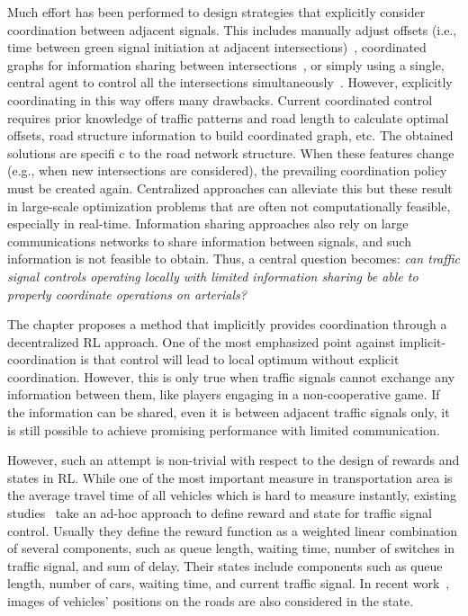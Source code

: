 Much effort has been performed to design strategies that explicitly consider coordination between adjacent signals. This includes manually adjust offsets (i.e., time between green signal initiation at adjacent intersections)~\cite{urbanik2015signal}, coordinated graphs for information sharing between intersections~\cite{KWBV08,VaOl16}, or simply using a single, central agent to control all the intersections simultaneously~\cite{brockfeld2001optimizing}. However, explicitly coordinating in this way offers many drawbacks. Current coordinated control requires prior knowledge of traffic patterns and road length to calculate optimal offsets, road structure information to build coordinated graph, etc. The obtained solutions are specifi c to the road network structure. When these features change (e.g., when new intersections are considered), the prevailing coordination policy must be created again. Centralized approaches can alleviate this but these result in large-scale optimization problems that are often not computationally feasible, especially in real-time. Information sharing approaches also rely on large communications networks to share information between signals, and such information is not feasible to obtain. Thus, a central question becomes: \textit{can traffic signal controls operating locally with limited information sharing be able to properly coordinate operations on arterials?}

The chapter proposes a method that implicitly provides coordination through a decentralized RL approach. One of the most emphasized point against implicit-coordination is that control will lead to local optimum without explicit coordination. However, this is only true when traffic signals cannot exchange any information between them, like players engaging in a non-cooperative game. If the information can be shared, even it is between adjacent traffic signals only, it is still possible to achieve promising performance with limited communication.

However, such an attempt is non-trivial with respect to the design of rewards and states in RL. While one of the most important measure in transportation area is the average travel time of all vehicles which is hard to measure instantly, existing studies~\cite{Wier00,VaOl16,wei2018intellilight} take an ad-hoc approach to define reward and state for traffic signal control. Usually they define the reward function as a weighted linear combination of several components, such as queue length, waiting time, number of switches in traffic signal, and sum of delay. Their states include components such as queue length, number of cars, waiting time, and current traffic signal. In recent work~\cite{VaOl16,wei2018intellilight}, images of vehicles' positions on the roads are also considered in the state. 

